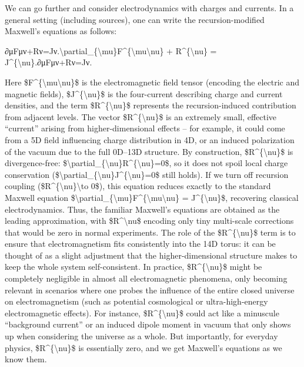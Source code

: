 \documentclass[
]{article}
\begin{document}
We can go further and consider electrodynamics with charges and
currents. In a general setting (including sources), one can write the
recursion-modified Maxwell's equations as follows:

∂μFμν+Rν=Jν.\textbackslash partial\_\{\textbackslash mu\}F\^{}\{\textbackslash mu\textbackslash nu\}
+ R\^{}\{\textbackslash nu\} =
J\^{}\{\textbackslash nu\}.∂μ\hspace{0pt}Fμν+Rν=Jν.

Here \$F\^{}\{\textbackslash mu\textbackslash nu\}\$ is the
electromagnetic field tensor (encoding the electric and magnetic
fields), \$J\^{}\{\textbackslash nu\}\$ is the four-current describing
charge and current densities, and the term
\$R\^{}\{\textbackslash nu\}\$ represents the recursion-induced
contribution from adjacent levels. The vector
\$R\^{}\{\textbackslash nu\}\$ is an extremely small, effective
``current'' arising from higher-dimensional effects -- for example, it
could come from a 5D field influencing charge distribution in 4D, or an
induced polarization of the vacuum due to the full 0D--13D structure. By
construction, \$R\^{}\{\textbackslash nu\}\$ is divergence-free:
\$\textbackslash partial\_\{\textbackslash nu\}R\^{}\{\textbackslash nu\}=0\$,
so it does not spoil local charge conservation
(\$\textbackslash partial\_\{\textbackslash nu\}J\^{}\{\textbackslash nu\}=0\$
still holds). If we turn off recursion coupling
(\$R\^{}\{\textbackslash nu\}\textbackslash to 0\$), this equation
reduces exactly to the standard Maxwell equation
\$\textbackslash partial\_\{\textbackslash mu\}F\^{}\{\textbackslash mu\textbackslash nu\}
= J\^{}\{\textbackslash nu\}\$, recovering classical electrodynamics.
Thus, the familiar Maxwell's equations are obtained as the leading
approximation, with \$R\^{}\textbackslash nu\$ encoding only tiny
multi-scale corrections that would be zero in normal experiments. The
role of the \$R\^{}\{\textbackslash nu\}\$ term is to ensure that
electromagnetism fits consistently into the 14D torus: it can be thought
of as a slight adjustment that the higher-dimensional structure makes to
keep the whole system self-consistent. In practice,
\$R\^{}\{\textbackslash nu\}\$ might be completely negligible in almost
all electromagnetic phenomena, only becoming relevant in scenarios where
one probes the influence of the entire closed universe on
electromagnetism (such as potential cosmological or ultra-high-energy
electromagnetic effects). For instance, \$R\^{}\{\textbackslash nu\}\$
could act like a minuscule ``background current'' or an induced dipole
moment in vacuum that only shows up when considering the universe as a
whole. But importantly, for everyday physics,
\$R\^{}\{\textbackslash nu\}\$ is essentially zero, and we get Maxwell's
equations as we know them.
\end{document}
